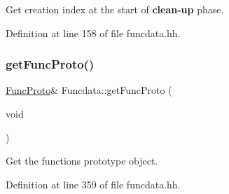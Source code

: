 Get creation index at the start of {\bfseries{clean-\/up}} phase. 



Definition at line 158 of file funcdata.\+hh.

\mbox{\label{class_funcdata_a1b1961c6d9c58e9a0a20f74c6e49853f}} 
\subsubsection{\texorpdfstring{getFuncProto()}{getFuncProto()}\hspace{0.1cm}{\footnotesize\ttfamily [1/2]}}
{\footnotesize\ttfamily \mbox{\hyperlink{class_func_proto}{Func\+Proto}}\& Funcdata\+::get\+Func\+Proto (\begin{DoxyParamCaption}\item[{void}]{ }\end{DoxyParamCaption})\hspace{0.3cm}{\ttfamily [inline]}}



Get the function\textquotesingle{}s prototype object. 



Definition at line 359 of file funcdata.\+hh.


